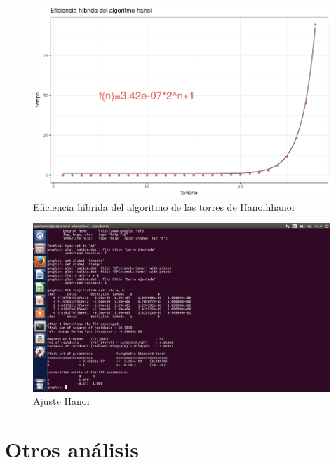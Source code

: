 \documentclass[a4paper, 11pt]{article}
\begin{document}
\begin{figure}[!hbp]
	\includegraphics[width=\textwidth]{hanoi_hibrido_formula.png}
	\caption{Eficiencia híbrida del algoritmo de las torres de Hanoi{hhanoi}}
\end{figure}
\begin{figure}[!hbp]
	\includegraphics[width=\textwidth]{gnuplot_hanoi.png}
	\caption{Ajuste Hanoi\label{ajust4}}
\end{figure}

\pagebreak
\section{Otros análisis}
\end{document}
